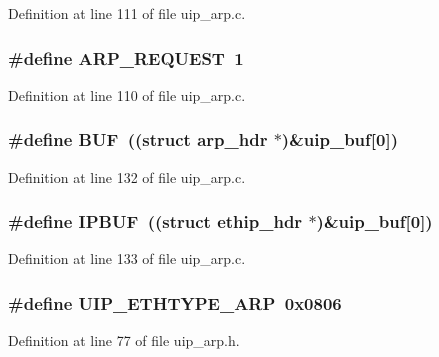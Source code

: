 Definition at line 111 of file uip\_\-arp.c.

\hypertarget{group__uiparp_ga7a7c46ffaba30477b8c9e3e61bd2e106}{
\subsubsection[{ARP\_\-REQUEST}]{\setlength{\rightskip}{0pt plus 5cm}\#define ARP\_\-REQUEST~1}}
\label{group__uiparp_ga7a7c46ffaba30477b8c9e3e61bd2e106}


Definition at line 110 of file uip\_\-arp.c.

\hypertarget{group__uiparp_ga24f52ac52d6e714cb04a5aa01be3bdd0}{
\subsubsection[{BUF}]{\setlength{\rightskip}{0pt plus 5cm}\#define BUF~((struct {\bf arp\_\-hdr} $\ast$)\&{\bf uip\_\-buf}\mbox{[}0\mbox{]})}}
\label{group__uiparp_ga24f52ac52d6e714cb04a5aa01be3bdd0}


Definition at line 132 of file uip\_\-arp.c.

\hypertarget{group__uiparp_ga9f2196e2705036869611962425e404bf}{
\subsubsection[{IPBUF}]{\setlength{\rightskip}{0pt plus 5cm}\#define IPBUF~((struct {\bf ethip\_\-hdr} $\ast$)\&{\bf uip\_\-buf}\mbox{[}0\mbox{]})}}
\label{group__uiparp_ga9f2196e2705036869611962425e404bf}


Definition at line 133 of file uip\_\-arp.c.

\hypertarget{group__uiparp_ga3e1562e8a6de32268e5df92a52152f91}{
\subsubsection[{UIP\_\-ETHTYPE\_\-ARP}]{\setlength{\rightskip}{0pt plus 5cm}\#define UIP\_\-ETHTYPE\_\-ARP~0x0806}}
\label{group__uiparp_ga3e1562e8a6de32268e5df92a52152f91}


Definition at line 77 of file uip\_\-arp.h.

